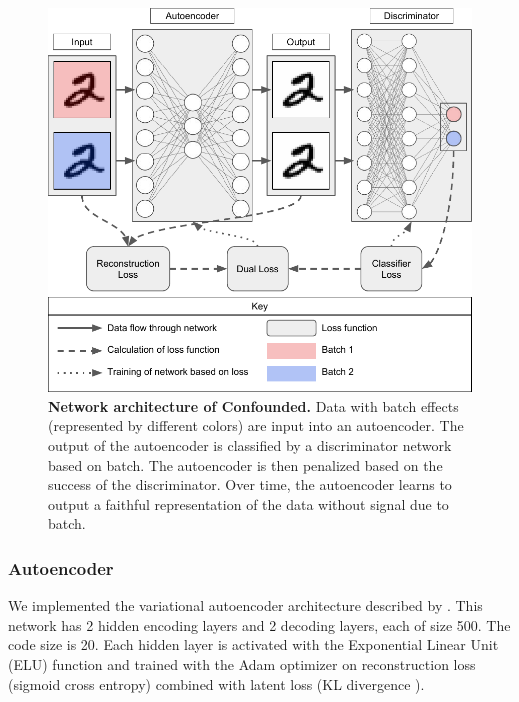 \documentclass[11pt]{article}
\begin{document}
\begin{figure}
	\centering
	\includegraphics[width=\columnwidth]{figures/final/network.pdf}
	\caption[Network architecture of Confounded]{\textbf{Network architecture of Confounded.}
	Data with batch effects (represented by different colors) are input into an autoencoder.
	The output of the autoencoder is classified by a discriminator network based on batch.
	The autoencoder is then penalized based on the success of the discriminator.
	Over time, the autoencoder learns to output a faithful representation of the data without signal due to batch.}
	\label{fig:network}
\end{figure}

\subsubsection{Autoencoder}

We implemented the variational autoencoder architecture \citep{louizos_variational_2015} described by \citet[Chapter 15]{geron_hands-machine_2017}.
This network has 2 hidden encoding layers and 2 decoding layers, each of size 500.
The code size is 20.
Each hidden layer is activated with the Exponential Linear Unit (ELU) function \citep{clevert_fast_2015} and trained with the Adam optimizer \citep{kingma_adam_2014} on reconstruction loss (sigmoid cross entropy) combined with latent loss (KL divergence \citep{kullback_information_1951}).
\end{document}
